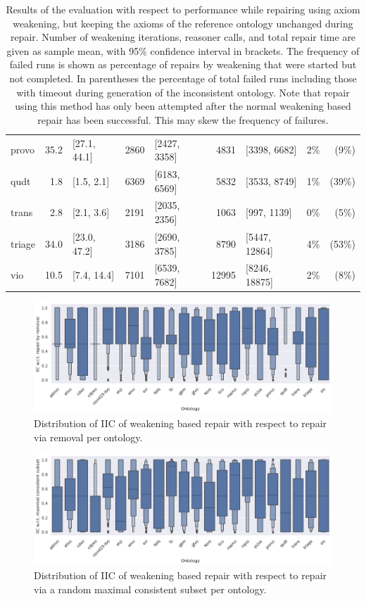 \begin{table}[htbp]
\begin{tabular}{|l|r@{ }lr@{ }lr@{ }lr@{ }r|}
    provo & 35.2 & [27.1, 44.1] & 2860 & [2427, 3358] & 4831 & [3398, 6682] & 2\% & (9\%) \\
    qudt & 1.8 & [1.5, 2.1] & 6369 & [6183, 6569] & 5832 & [3533, 8749] & 1\% & (39\%) \\
    trans & 2.8 & [2.1, 3.6] & 2191 & [2035, 2356] & 1063 & [997, 1139] & 0\% & (5\%) \\
    triage & 34.0 & [23.0, 47.2] & 3186 & [2690, 3785] & 8790 & [5447, 12864] & 4\% & (53\%) \\
    vio & 10.5 & [7.4, 14.4] & 7101 & [6539, 7682] & 12995 & [8246, 18875] & 2\% & (8\%) \\
    \hline
  \end{tabular}
  \caption{Results of the evaluation with respect to performance while repairing using axiom weakening, but keeping the axioms of the reference ontology unchanged during repair. Number of weakening iterations, reasoner calls, and total repair time are given as sample mean, with 95\% confidence interval in brackets. The frequency of failed runs is shown as percentage of repairs by weakening that were started but not completed. In parentheses the percentage of total failed runs including those with timeout during generation of the inconsistent ontology. Note that repair using this method has only been attempted after the normal weakening based repair has been successful. This may skew the frequency of failures.}
\end{table}

\iffalse

\begin{figure}[htbp]
  \centering
  \includegraphics[width=\textwidth]{resources/iic-remove-ontology-violin.png}
  \caption{Distribution of IIC of weakening based repair with respect to repair via removal per ontology.}
\end{figure}

\begin{figure}[htbp]
  \centering
  \includegraphics[width=\textwidth]{resources/iic-mcs-ontology-violin.png}
  \caption{Distribution of IIC of weakening based repair with respect to repair via a random maximal consistent subset per ontology.}
\end{figure}

